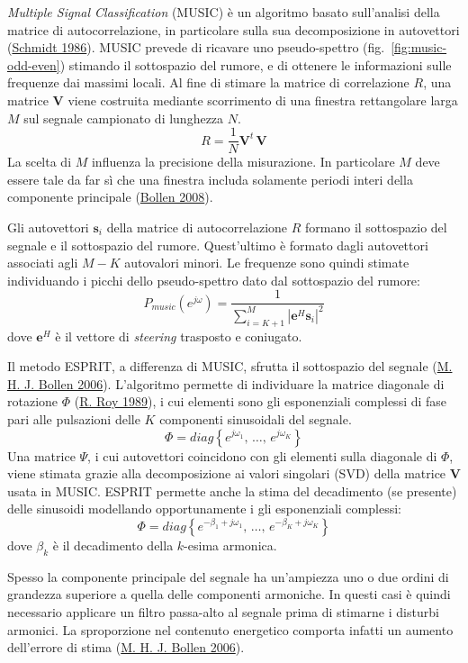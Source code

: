 \documentclass[
  italian,
]{article}
\begin{document}
\emph{Multiple Signal Classification} (MUSIC) è un algoritmo basato
sull'analisi della matrice di autocorrelazione, in particolare sulla sua
decomposizione in autovettori
(\protect\hyperlink{ref-multiple-emitter-location}{Schmidt 1986}). MUSIC
prevede di ricavare uno pseudo-spettro (fig.~\ref{fig:music-odd-even})
stimando il sottospazio del rumore, e di ottenere le informazioni sulle
frequenze dai massimi locali. Al fine di stimare la matrice di
correlazione \(R\), una matrice \(\mathbf{V}\) viene costruita mediante
scorrimento di una finestra rettangolare larga \(M\) sul segnale
campionato di lunghezza \(N\). \[
R = \frac{1}{N} \mathbf{V}^t \, \mathbf{V}
\] La scelta di \(M\) influenza la precisione della misurazione. In
particolare \(M\) deve essere tale da far sì che una finestra includa
solamente periodi interi della componente principale
(\protect\hyperlink{ref-sliding-window-esprit}{Bollen 2008}).

Gli autovettori \(\mathbf{s}_i\) della matrice di autocorrelazione \(R\)
formano il sottospazio del segnale e il sottospazio del rumore.
Quest'ultimo è formato dagli autovettori associati agli \(M - K\)
autovalori minori. Le frequenze sono quindi stimate individuando i
picchi dello pseudo-spettro dato dal sottospazio del rumore: \[
P_{music} \left( e^{j \omega} \right) =
\frac{1}{\sum_{i=K+1}^{M} \left| \mathbf{e}^H \mathbf{s}_i  \right|^2}
\] dove \(\mathbf{e}^H\) è il vettore di \emph{steering} trasposto e
coniugato.

Il metodo ESPRIT, a differenza di MUSIC, sfrutta il sottospazio del
segnale (\protect\hyperlink{ref-dsp-pqd}{M. H. J. Bollen 2006}).
L'algoritmo permette di individuare la matrice diagonale di rotazione
\(\Phi\) (\protect\hyperlink{ref-esprit-original}{R. Roy 1989}), i cui
elementi sono gli esponenziali complessi di fase pari alle pulsazioni
delle \(K\) componenti sinusoidali del segnale. \[
\Phi = diag \left\{ e^{j \omega_1}, \, \ldots, \, e^{j \omega_K} \right\}
\] Una matrice \(\Psi\), i cui autovettori coincidono con gli elementi
sulla diagonale di \(\Phi\), viene stimata grazie alla decomposizione ai
valori singolari (SVD) della matrice \(\mathbf{V}\) usata in MUSIC.
ESPRIT permette anche la stima del decadimento (se presente) delle
sinusoidi modellando opportunamente i gli esponenziali complessi: \[
\Phi = diag \left\{
    e^{-\beta_1 + j \omega_1}, \, \ldots, \, e^{- \beta_K + j \omega_K}
\right\}
\] dove \(\beta_k\) è il decadimento della \(k\)-esima armonica.

Spesso la componente principale del segnale ha un'ampiezza uno o due
ordini di grandezza superiore a quella delle componenti armoniche. In
questi casi è quindi necessario applicare un filtro passa-alto al
segnale prima di stimarne i disturbi armonici. La sproporzione nel
contenuto energetico comporta infatti un aumento dell'errore di stima
(\protect\hyperlink{ref-dsp-pqd}{M. H. J. Bollen 2006}).
\end{document}

